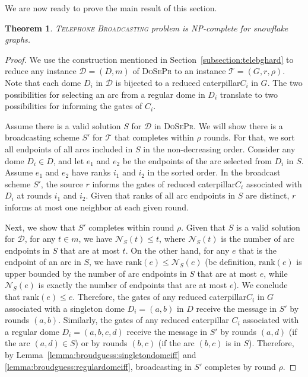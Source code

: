 \documentclass[letterpaper,11pt]{article}
\newtheorem{theorem}{Theorem}[section]
\newcommand{\flower}{snowflake\xspace}
\newcommand{\telebr}{\textsc{Telephone Broadcasting}\xspace}
\newcommand{\dspr}{\textsc{DoSePr}\xspace}
\newcommand{\cater}{reduced caterpillar\xspace}
\newcommand{\rrank}{\text{rank}}
\begin{document}
We are now ready to prove the main result of this section.

\begin{theorem} \label{thm:hardness-flower}
    \telebr problem is NP-complete for \flower graphs.
\end{theorem}
\begin{proof}
We use the construction mentioned in Section~\ref{subsection:telebghard} to reduce any instance $\mathcal{D}=(D,m)$ of \dspr to an instance $\mathcal{T}=(G,r,\rho)$. 
Note that each dome $D_i$ in $\mathcal{D}$ is bijected to a \cater $C_i$ in $G$. The two possibilities for selecting an arc from a regular dome in $D_i$ translate to two possibilities for informing the gates of $C_i$. 


Assume there is a valid solution $S$ for $\mathcal{D}$ in \dspr. We will show there is a broadcasting scheme $S'$ for $\mathcal{T}$ that completes within $\rho$ rounds. For that, we sort all endpoints of all arcs included in $S$ in the non-decreasing order. Consider any dome $D_i \in D$, and let $e_1$ and $e_2$ be the endpoints of the arc selected from $D_i$ in $S$. Assume $e_1$ and $e_2$ have ranks $i_1$ and $i_2$ in the sorted order. In the broadcast scheme $S'$, the source $r$ informs the gates of \cater $C_i$ associated with $D_i$ at rounds $i_1$ and $i_2$. Given that ranks of all arc endpoints in $S$ are distinct, $r$ informs at most one neighbor at each given round. 

Next, we show that $S'$ completes within round $\rho$.
Given that $S$ is a valid solution for $\mathcal{D}$, for any $t\in m$, we have $\mathcal{N}_S(t) \leq t$, where $\mathcal{N}_S(t)$ is the number of arc endpoints in $S$ that are at most $t$. On the other hand, for any $e$ that is the endpoint of an arc in $S$, we have $\rrank(e) \leq \mathcal{N}_S(e)$ (be definition, $\rrank(e)$ is upper bounded by the number of arc endpoints in $S$ that are at most $e$, while $\mathcal{N}_S(e)$ is exactly the number of endpoints that are at most $e$). We conclude that $\rrank(e) \leq e$. 
Therefore, the gates of any \cater $C_i$ in $G$ associated with a singleton dome $D_i = (a,b)$ in $D$ receive the message in $S'$ by rounds $(a,b)$. Similarly, the gates of any \cater
$C_i$ associated with a regular
dome $D_i = (a,b,c,d)$ receive the message in $S'$ by rounds $(a,d)$ (if the arc $(a,d) \in S$) or by rounds $(b,c)$ (if the arc $(b,c)$ is in $S$). Therefore, by Lemma~\ref{lemma:broudguess:singletondomeiff} and \ref{lemma:broudguess:regulardomeiff}, broadcasting in $S'$ completes by round $\rho$.


\end{proof}
\end{document}
